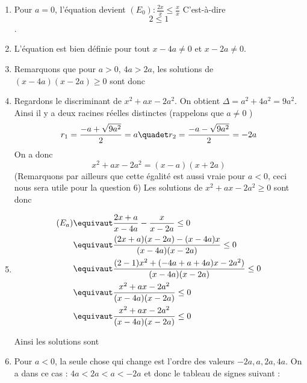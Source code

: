 \documentclass[a4paper, 11pt,reqno]{article}
\begin{document}
\begin{correction}
\begin{enumerate}
\item Pour $a=0$, l'équation devient $(E_0)  : \frac{2x}{x} \leq \frac{x}{x}$ 
C'est-à-dire $$2\leq 1$$. 
\item L'équation est bien définie pour tout $x-4a \neq 0$ et $x -2a\neq 0$. 
\item Remarquons que pour $a>0$, $4a>2a$, les solutions de $(x-4a)(x-2a)\geq0$ sont donc 
\conclusion{ $S_1 = ]-\infty , 2a[ \cup ]4a, +\infty[$}
\item Regardons le discriminant de $x^2 +ax-2a^2 $. On obtient 
$\Delta = a^2 +4a^2 = 9a^2$.
Ainsi il y a deux racines réelles distinctes (rappelons que $a\neq 0$ ) 
$$r_1 = \frac{-a +\sqrt{9a^2}}{2} = a \quadet r_2  = \frac{-a -\sqrt{9a^2}}{2} = -2a$$
On  a donc $$x^2 +ax-2a^2  = (x-a)(x+2a)$$
(Remarquons par ailleurs que cette égalité est aussi vraie pour $a<0$, ceci nous sera utile pour la question 6) 
Les solutions  de $x^2 +ax-2a^2 \geq 0 $ sont donc 
\conclusion{ $] -\infty, -2a[\cup ]a, +\infty[$}
\item 
\begin{align*}
(E_a) \equivaut & \frac{2x+a}{x-4a} -\frac{x}{x-2a} \leq 0\\
		\equivaut & \frac{(2x+a)(x-2a) -(x-4a)x}{(x-4a)(x-2a)}\leq 0\\		
		\equivaut & \frac{(2-1)x^2+(-4a+a+4a)x -2a^2)}{(x-4a)(x-2a)}\leq 0\\		
		\equivaut & \frac{x^2+ax -2a^2}{(x-4a)(x-2a)}\leq 0	\\			
		\equivaut & \frac{x^2+ax -2a^2}{(x-4a)(x-2a)}\leq 0	
\end{align*}
  
 Ainsi les solutions sont 
 \conclusion{ $S_a =[-2a,a] \cup ]2a,4a[$}
 
 \item Pour $a<0$, la seule chose qui change est l'ordre des  valeurs $-2a,a,2a,4a$. On a dans ce cas : $4a<2a <a<-2a$ et donc le tableau de signes suivant : 
 

\end{enumerate}
\end{correction}
\end{document}
